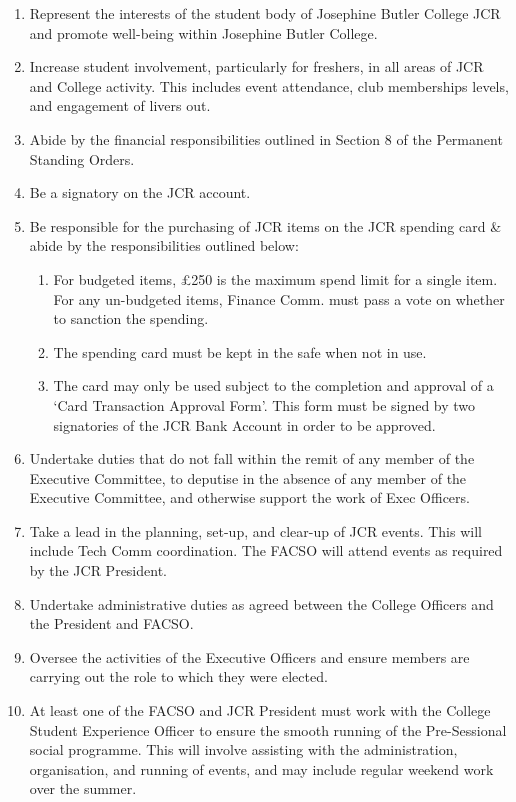 \begin{enumerate}
    \item Represent the interests of the student body of Josephine Butler College JCR and promote well-being within Josephine Butler College.
    \item Increase student involvement, particularly for freshers, in all areas of JCR and College activity. This includes event attendance, club memberships levels, and engagement of livers out.
    \item Abide by the financial responsibilities outlined in Section 8 of the Permanent Standing Orders. %
    \item Be a signatory on the JCR account.
    \item Be responsible for the purchasing of JCR items on the JCR spending card & abide by the responsibilities outlined below:
    \begin{enumerate}
        \item For budgeted items, £250 is the maximum spend limit for a single item. For any un-budgeted items, Finance Comm. must pass a vote on whether to sanction the spending.
        \item The spending card must be kept in the safe when not in use.
        \item The card may only be used subject to the completion and approval of a ‘Card Transaction Approval Form’. This form must be signed by two signatories of the JCR Bank Account in order to be approved.
    \end{enumerate}
    \item Undertake duties that do not fall within the remit of any member of the Executive Committee, to deputise in the absence of any member of the Executive Committee, and otherwise support the work of Exec Officers. 
    \item Take a lead in the planning, set-up, and clear-up of JCR events. This will include Tech Comm coordination. The FACSO will attend events as required by the JCR President.
    \item Undertake administrative duties as agreed between the College Officers and the President and FACSO. 
    \item Oversee the activities of the Executive Officers and ensure members are carrying out the role to which they were elected.
    \item At least one of the FACSO and JCR President must work with the College Student Experience Officer to ensure the smooth running of the Pre-Sessional social programme. This will involve assisting with the administration, organisation, and running of events, and may include regular weekend work over the summer.

\end{enumerate}
